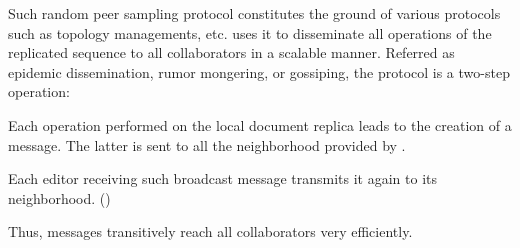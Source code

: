 Such random peer sampling protocol constitutes the ground of various protocols
such as topology managements,  etc. \CRATE uses it to disseminate all
operations of the replicated sequence to all collaborators in a scalable
manner. Referred as epidemic dissemination, rumor mongering, or gossiping, the
protocol is a two-step operation:
\begin{inparaenum}[(i)]
\item Each operation performed on the local document replica leads to the
  creation of a message. The latter is sent to all the neighborhood provided by
  \SPRAY.
\item Each editor receiving such broadcast message transmits it again to its
  neighborhood. ()
\end{inparaenum}
Thus, messages transitively reach all collaborators very efficiently.

